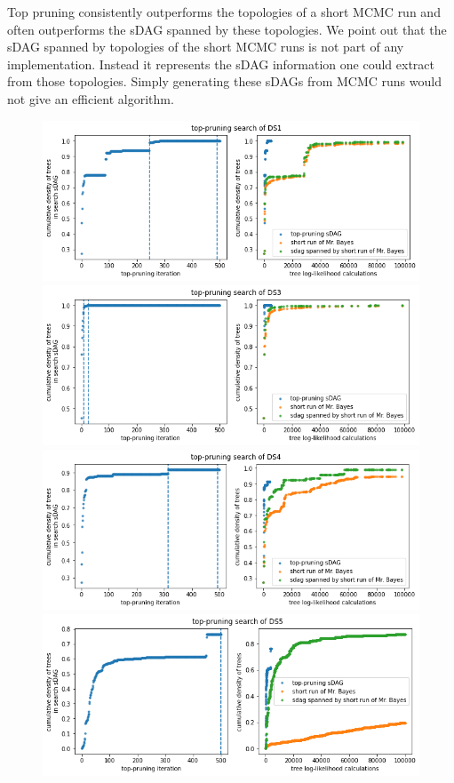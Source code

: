 \documentclass{article}
\begin{document}
Top pruning consistently outperforms the topologies of a short MCMC run and often outperforms the sDAG spanned by these topologies.
We point out that the sDAG spanned by topologies of the short MCMC runs is not part of any implementation. 
Instead it represents the sDAG information one could extract from those topologies.
Simply generating these sDAGs from MCMC runs would not give an efficient algorithm.

\begin{figure}[!b]\centering
\includegraphics[scale=0.4]{figures/tp_ds1_pp.png}
\includegraphics[scale=0.4]{figures/tp_ds3_pp.png}
\includegraphics[scale=0.4]{figures/tp_ds4_pp.png}
\includegraphics[scale=0.4]{figures/tp_ds5_pp.png}
\end{figure}
\end{document}
